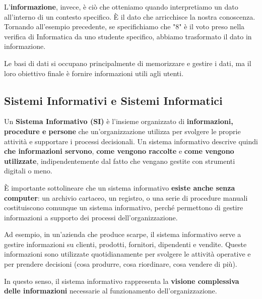 \documentclass[a4paper,12pt]{article}
\begin{document}
L'\textbf{informazione}, invece, è ciò che otteniamo quando interpretiamo un dato all'interno di un contesto specifico. È il dato che arricchisce la nostra conoscenza. Tornando all'esempio precedente, se specifichiamo che "8" è il voto preso nella verifica di Informatica da uno studente specifico, abbiamo trasformato il dato in informazione.

Le basi di dati si occupano principalmente di memorizzare e gestire i dati, ma il loro obiettivo finale è fornire informazioni utili agli utenti.

\subsection{Sistemi Informativi e Sistemi Informatici}

Un \textbf{Sistema Informativo (SI)} è l’insieme organizzato di \textbf{informazioni, procedure e persone} che un’organizzazione utilizza per svolgere le proprie attività e supportare i processi decisionali.  
Un sistema informativo descrive quindi \textbf{che informazioni servono}, \textbf{come vengono raccolte} e \textbf{come vengono utilizzate}, indipendentemente dal fatto che vengano gestite con strumenti digitali o meno.

È importante sottolineare che un sistema informativo \textbf{esiste anche senza computer}: un archivio cartaceo, un registro, o una serie di procedure manuali costituiscono comunque un sistema informativo, perché permettono di gestire informazioni a supporto dei processi dell’organizzazione.

Ad esempio, in un’azienda che produce scarpe, il sistema informativo serve a gestire informazioni su clienti, prodotti, fornitori, dipendenti e vendite. Queste informazioni sono utilizzate quotidianamente per svolgere le attività operative e per prendere decisioni (cosa produrre, cosa riordinare, cosa vendere di più).

In questo senso, il sistema informativo rappresenta la \textbf{visione complessiva delle informazioni} necessarie al funzionamento dell’organizzazione.
\end{document}
